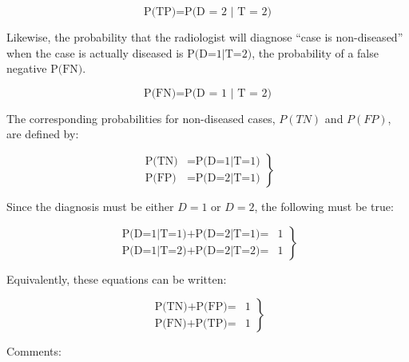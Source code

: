 \documentclass[
]{book}
\begin{document}
\begin{equation} 
\text{P(TP)} = \text{P(D = 2 | T = 2)}
\label{eq:binary-task-p-tp}
\end{equation}

Likewise, the probability that the radiologist will diagnose ``case is non-diseased'' when the case is actually diseased is \(\text{P(D=1|T=2)}\), the probability of a false negative \(\text{P(FN)}\).

\begin{equation} 
\text{P(FN)} = \text{P(D = 1 | T = 2)}
\label{eq:binary-task-p-fn}
\end{equation}

The corresponding probabilities for non-diseased cases, \(P(TN)\) and \(P(FP)\), are defined by:

\begin{equation} 
\left.
\begin{aligned}
\text{P(TN)}&=\text{P(D=1|T=1)}\\ 
\text{P(FP)}&=\text{P(D=2|T=1)}
\end{aligned}
\right\}
\label{eq:binary-task-p-tn-fp}
\end{equation}

Since the diagnosis must be either \(D=1\) or \(D=2\), the following must be true:

\begin{equation} 
\left.
\begin{aligned}  
\text{P(D=1|T=1)+P(D=2|T=1)}=&1\\ 
\text{P(D=1|T=2)+P(D=2|T=2)}=&1
\end{aligned}
\right \}
\label{eq:binary-task-p-sum-to-unity}
\end{equation}

Equivalently, these equations can be written:

\begin{equation} 
\left.
\begin{aligned}  
\text{P(TN)+P(FP)}=& 1\\ 
\text{P(FN)+P(TP)}=& 1
\end{aligned}
\right \}
\label{eq:binary-task-p-sum-to-unity2}
\end{equation}

Comments:
\end{document}
